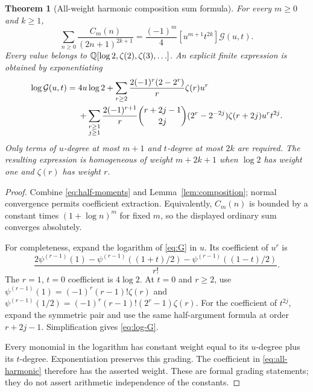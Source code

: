 \documentclass[11pt,a4paper]{article}
\numberwithin{equation}{section}
\newtheorem{theorem}{Theorem}[section]
\theoremstyle{definition}\newtheorem{definition}[theorem]{Definition}
\theoremstyle{remark}\newtheorem{remark}[theorem]{Remark}
\newcommand{\Gcal}{\mathcal G}\newcommand{\Rcal}{\mathcal R}
\begin{document}
\begin{theorem}[All-weight harmonic composition sum formula]
\label{thm:harmonic}
For every $m\ge0$ and $k\ge1$,
\begin{equation}
 \boxed{\displaystyle
 \sum_{n\ge0}\frac{C_m(n)}{(2n+1)^{2k+1}}
       =\frac{(-1)^m}{4}[u^{m+1}t^{2k}]\Gcal(u,t).}
 \label{eq:all-harmonic}
\end{equation}
Every value belongs to $\mathbb Q[\log2,\zeta(2),\zeta(3),\ldots]$.
An explicit finite expression is obtained by exponentiating
\begin{align}
 \log\Gcal(u,t)={}&4u\log2
 +\sum_{r\ge2}\frac{2(-1)^r(2-2^r)}r\zeta(r)u^r\notag\\
 &+\sum_{\substack{r\ge1\\j\ge1}}
 \frac{2(-1)^{r+1}}r\binom{r+2j-1}{2j}
 (2^r-2^{-2j})\zeta(r+2j)u^rt^{2j}.
 \label{eq:log-G}
\end{align}
Only terms of $u$-degree at most $m+1$ and $t$-degree at most $2k$
are required. The resulting expression is homogeneous of weight
$m+2k+1$ when $\log2$ has weight one and $\zeta(r)$ has weight $r$.
\end{theorem}
\begin{proof}
Combine \eqref{eq:half-moments} and Lemma~\ref{lem:composition};
normal convergence permits coefficient extraction. Equivalently,
$C_m(n)$ is bounded by a constant times $(1+\log n)^m$ for fixed
$m$, so the displayed ordinary sum converges absolutely.

For completeness, expand the logarithm of \eqref{eq:G} in $u$.
Its coefficient of $u^r$ is
\[
 \frac{2\psi^{(r-1)}(1)
   -\psi^{(r-1)}((1+t)/2)-\psi^{(r-1)}((1-t)/2)}{r!}.
\]
The $r=1$, $t=0$ coefficient is $4\log2$. At $t=0$ and $r\ge2$,
use
$\psi^{(r-1)}(1)=(-1)^r(r-1)!\zeta(r)$ and
$\psi^{(r-1)}(1/2)=(-1)^r(r-1)!(2^r-1)\zeta(r)$.
For the coefficient of $t^{2j}$, expand the symmetric pair and use
the same half-argument formula at order $r+2j-1$. Simplification gives
\eqref{eq:log-G}.

Every monomial in the logarithm has constant weight equal to its
$u$-degree plus its $t$-degree. Exponentiation preserves this grading.
The coefficient in \eqref{eq:all-harmonic} therefore has the asserted
weight. These are formal grading statements; they do not assert
arithmetic independence of the constants.
\end{proof}
\end{document}
